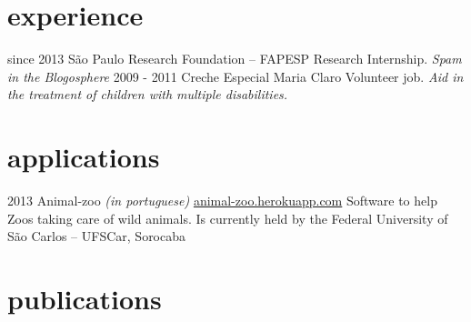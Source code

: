 \documentclass[]{friggeri-cv}
\begin{document}
\section{experience}

\begin{entrylist}
  \entry
    {since 2013}
    {São Paulo Research Foundation -- FAPESP}
    {Research Internship.}
    {\emph{Spam in the Blogosphere}}
  \entry
    {2009 - 2011}
    {Creche Especial Maria Claro}
    {Volunteer job.}
    {\emph{Aid in the treatment of children with multiple disabilities.}}
\end{entrylist}

\section{applications}

\begin{entrylist}
  \entry
    {2013}
    {Animal-zoo \emph{(in portuguese)}}
    {\href{http://animal-zoo.herokuapp.com}{animal-zoo.herokuapp.com}}
    {Software to help Zoos taking care of wild animals. Is currently held by the Federal University of São Carlos -- UFSCar, Sorocaba}
\end{entrylist}

\section{publications}


\begin{refsection}
  \nocite{*}
  \printbibliography[sorting=chronological, type=inproceedings, title={international conferences/proceedings}, notkeyword={brazil}, heading=subbibliography]
\end{refsection}
\begin{refsection}
  \nocite{*}
  \printbibliography[sorting=chronological, type=inproceedings, title={local conferences/proceedings}, keyword={brazil}, heading=subbibliography]
\end{refsection}
\end{document}
